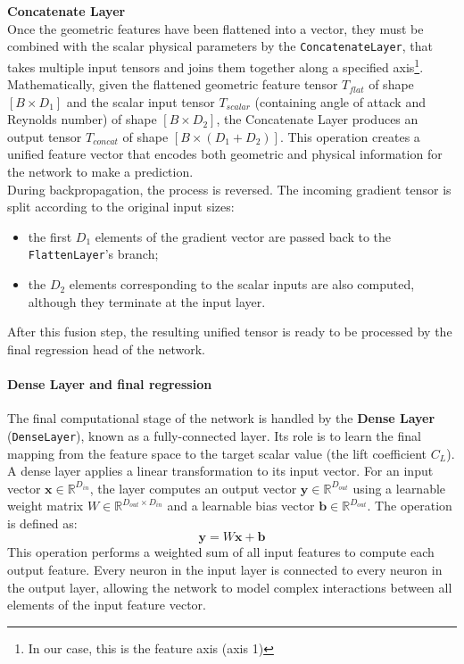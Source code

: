 \textbf{Concatenate Layer}\\

Once the geometric features have been flattened into a vector, they must be combined with the scalar physical parameters by the \texttt{ConcatenateLayer}, that takes multiple input tensors and joins them together along a specified axis\footnote{In our case, this is the feature axis (axis 1)}.\\

Mathematically, given the flattened geometric feature tensor $T_{flat}$ of shape $[B\times D_1]$ and the scalar input tensor $T_{scalar}$ (containing angle of attack and Reynolds number) of shape $[B\times D_2]$, the Concatenate Layer produces an output tensor $T_{concat}$ of shape $[B\times (D_1+D_2)]$. This operation creates a unified feature vector that encodes both geometric and physical information for the network to make a prediction.\\

During backpropagation, the process is reversed. The incoming gradient tensor is split according to the original input sizes:
\begin{itemize}
    \item[-] the first $D_1$ elements of the gradient vector are passed back to the \texttt{FlattenLayer}'s branch;
    \item[-] the $D_2$ elements corresponding to the scalar inputs are also computed, although they terminate at the input layer.
\end{itemize}
\vspace{2ex}
After this fusion step, the resulting unified tensor is ready to be processed by the final regression head of the network.

\paragraph{Dense Layer and final regression}
\label{sec:03_dense_layer}

The final computational stage of the network is handled by the\textbf{ Dense Layer} (\texttt{DenseLayer}), known as a fully-connected layer. Its role is to learn the final mapping from the feature space to the target scalar value (the lift coefficient $C_L$).\\

A dense layer applies a linear transformation to its input vector. For an input vector $\mathbf x\in \mathbb R^{D_{in}}$, the layer computes an output vector $\mathbf y\in \mathbb R^{D_{out}}$ using a learnable weight matrix $W\in \mathbb R^{D_{out}\times D_{in}}$ and a learnable bias vector $\mathbf b\in\mathbb R^{D_{out}}$. The operation is defined as:
\begin{equation}
    \mathbf y=W\mathbf x+\mathbf b
\end{equation}
This operation performs a weighted sum of all input features to compute each output feature. Every neuron in the input layer is connected to every neuron in the output layer, allowing the network to model complex interactions between all elements of the input feature vector.\\

